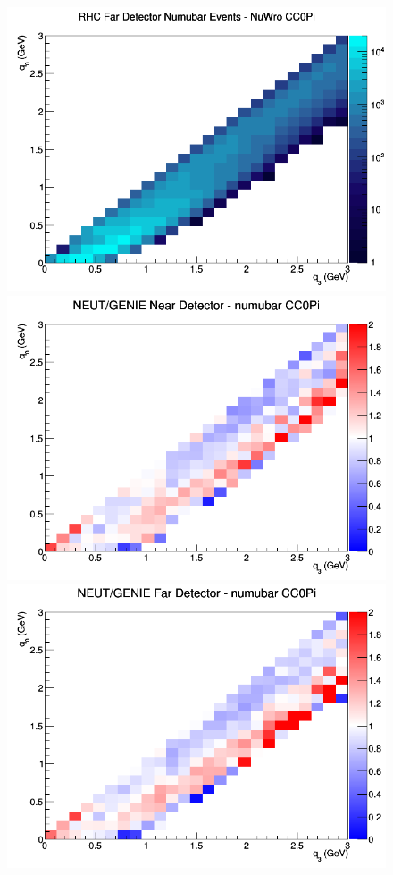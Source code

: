 \begin{figure}[h]
\endminipage
{}
\includegraphics[width=\linewidth]{q0_q3/nominal/CC0Pi_RHC_FD_numubar_q3_q0_NuWro.png}
\endminipage
\newline
{}
\includegraphics[width=\linewidth]{q0_q3/nominal/ratios/CC0Pi_NEUT_GENIE_numubar_near_q3_q0.png}
\endminipage
{}
\includegraphics[width=\linewidth]{q0_q3/nominal/ratios/CC0Pi_NEUT_GENIE_numubar_far_q3_q0.png}

\end{figure}
